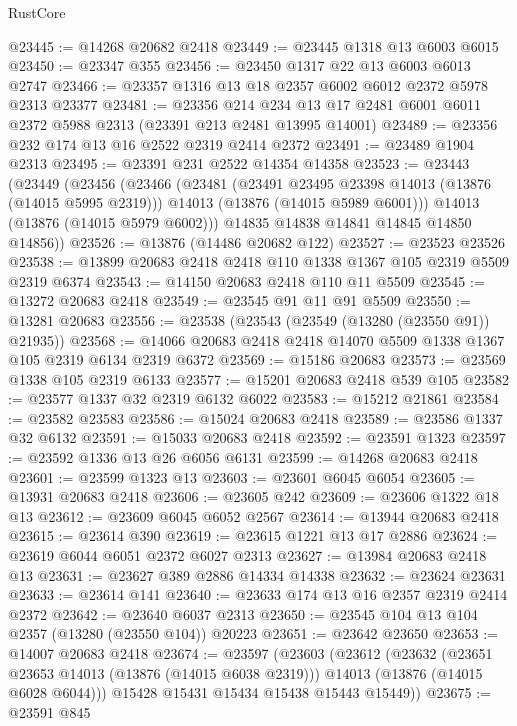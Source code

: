 \begin{lexlean}{RustCore}
\begin{coremodule}
@23445 := @14268 @20682 @2418
@23449 := @23445 @1318 @13 @6003 @6015
@23450 := @23347 @355
@23456 := @23450 @1317 @22 @13 @6003 @6013 @2747
@23466 := @23357 @1316 @13 @18 @2357 @6002 @6012 @2372 @5978 @2313 @23377
@23481 := @23356
    @214
    @234
    @13
    @17
    @2481
    @6001
    @6011
    @2372
    @5988
    @2313
    (@23391 @213 @2481 @13995 @14001)
@23489 := @23356 @232 @174 @13 @16 @2522 @2319 @2414 @2372
@23491 := @23489 @1904 @2313
@23495 := @23391 @231 @2522 @14354 @14358
@23523 := @23443
    (@23449
      (@23456
        (@23466
          (@23481
            (@23491 @23495 @23398 @14013 (@13876 (@14015 @5995 @2319)))
            @14013
            (@13876 (@14015 @5989 @6001)))
          @14013
          (@13876 (@14015 @5979 @6002)))
        @14835
        @14838
        @14841
        @14845
        @14850
        @14856))
@23526 := @13876 (@14486 @20682 @122)
@23527 := @23523 @23526
@23538 := @13899 @20683 @2418 @2418 @110 @1338 @1367 @105 @2319 @5509 @2319 @6374
@23543 := @14150 @20683 @2418 @110 @11 @5509
@23545 := @13272 @20683 @2418
@23549 := @23545 @91 @11 @91 @5509
@23550 := @13281 @20683
@23556 := @23538 (@23543 (@23549 (@13280 (@23550 @91)) @21935))
@23568 := @14066 @20683 @2418 @2418 @14070 @5509 @1338 @1367 @105 @2319 @6134 @2319 @6372
@23569 := @15186 @20683
@23573 := @23569 @1338 @105 @2319 @6133
@23577 := @15201 @20683 @2418 @539 @105
@23582 := @23577 @1337 @32 @2319 @6132 @6022
@23583 := @15212 @21861
@23584 := @23582 @23583
@23586 := @15024 @20683 @2418
@23589 := @23586 @1337 @32 @6132
@23591 := @15033 @20683 @2418
@23592 := @23591 @1323
@23597 := @23592 @1336 @13 @26 @6056 @6131
@23599 := @14268 @20683 @2418
@23601 := @23599 @1323 @13
@23603 := @23601 @6045 @6054
@23605 := @13931 @20683 @2418
@23606 := @23605 @242
@23609 := @23606 @1322 @18 @13
@23612 := @23609 @6045 @6052 @2567
@23614 := @13944 @20683 @2418
@23615 := @23614 @390
@23619 := @23615 @1221 @13 @17 @2886
@23624 := @23619 @6044 @6051 @2372 @6027 @2313
@23627 := @13984 @20683 @2418 @13
@23631 := @23627 @389 @2886 @14334 @14338
@23632 := @23624 @23631
@23633 := @23614 @141
@23640 := @23633 @174 @13 @16 @2357 @2319 @2414 @2372
@23642 := @23640 @6037 @2313
@23650 := @23545 @104 @13 @104 @2357 (@13280 (@23550 @104)) @20223
@23651 := @23642 @23650
@23653 := @14007 @20683 @2418
@23674 := @23597
    (@23603
      (@23612
        (@23632
          (@23651 @23653 @14013 (@13876 (@14015 @6038 @2319)))
          @14013
          (@13876 (@14015 @6028 @6044)))
        @15428
        @15431
        @15434
        @15438
        @15443
        @15449))
@23675 := @23591 @845

\end{coremodule}
\end{lexlean}
